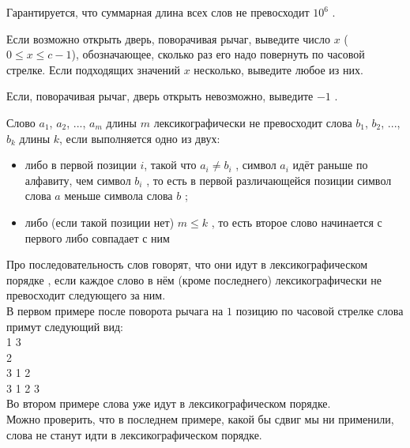 \begin{problem}
Гарантируется, что суммарная длина всех слов не превосходит $10^6$ .

\OutputFile

Если возможно открыть дверь, поворачивая рычаг, выведите число $x$ ($0 \le x \le c - 1$), обозначающее, сколько раз его надо повернуть по часовой стрелке. Если подходящих значений $x$ несколько, выведите любое из них.

Если, поворачивая рычаг, дверь открыть невозможно, выведите $-1$ .

\Examples

\begin{example}
%
%
%
\end{example}

\Explanation

Слово $a_1$, $a_2$, ..., $a_m$ длины $m$ лексикографически не превосходит слова $b_1$, $b_2$, ..., $b_k$ длины $k$, если выполняется одно из двух:

\begin{itemize}
    \item либо в первой позиции $i$, такой что $a_i \neq b_i$ , символ $a_i$ идёт раньше по алфавиту, чем символ $b_i$ , то есть в первой различающейся позиции символ слова $a$ меньше символа слова $b$ ;
    \item либо (если такой позиции нет) $m \le k$ , то есть второе слово начинается с первого либо совпадает с ним
\end{itemize}

Про последовательность слов говорят, что они идут в лексикографическом порядке , если каждое слово в нём (кроме последнего) лексикографически не превосходит следующего за ним.\\

В первом примере после поворота рычага на $1$ позицию по часовой стрелке слова примут следующий вид:\\
1 3\\
2\\
3 1 2\\
3 1 2 3\\

Во втором примере слова уже идут в лексикографическом порядке.\\

Можно проверить, что в последнем примере, какой бы сдвиг мы ни применили, слова не станут идти в лексикографическом порядке.

\end{problem}